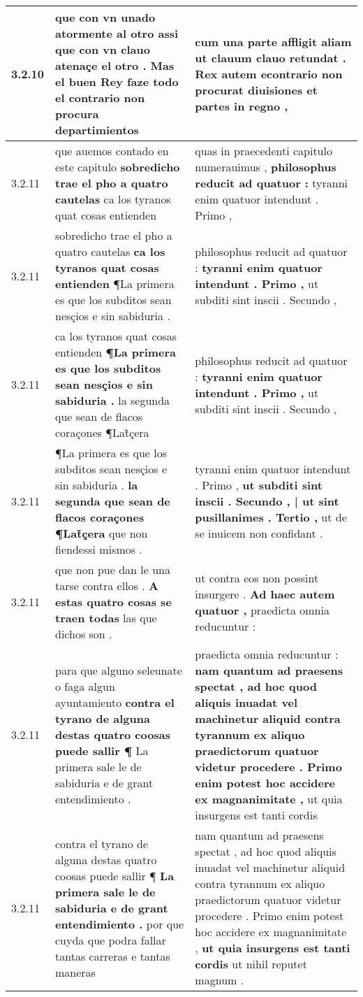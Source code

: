 \begin{tabular}{|p{1cm}|p{6.5cm}|p{6.5cm}|}
3.2.10 & que con vn unado atormente al otro assi que con vn clauo atenaçe el otro . \textbf{ Mas el buen Rey faze todo el contrario } non procura departimientos & cum una parte affligit aliam \textbf{ ut clauum clauo retundat . Rex autem econtrario non procurat diuisiones } et partes in regno , \\\hline
3.2.11 & que auemos contado en este capitulo \textbf{ sobredicho trae el pho a quatro cautelas } ca los tyranos quat cosas entienden & quas in praecedenti capitulo numerauimus , \textbf{ philosophus reducit ad quatuor : } tyranni enim quatuor intendunt . Primo , \\\hline
3.2.11 & sobredicho trae el pho a quatro cautelas \textbf{ ca los tyranos quat cosas entienden } ¶La primera es que los subditos sean nesçios e sin sabiduria . & philosophus reducit ad quatuor : \textbf{ tyranni enim quatuor intendunt . Primo , } ut subditi sint inscii . Secundo , \\\hline
3.2.11 & ca los tyranos quat cosas entienden \textbf{ ¶La primera es que los subditos sean nesçios e sin sabiduria . } la segunda que sean de flacos coraçones ¶Lat̃çera & philosophus reducit ad quatuor : \textbf{ tyranni enim quatuor intendunt . Primo , } ut subditi sint inscii . Secundo , \\\hline
3.2.11 & ¶La primera es que los subditos sean nesçios e sin sabiduria . \textbf{ la segunda que sean de flacos coraçones ¶Lat̃çera } que non fiendessi mismos . & tyranni enim quatuor intendunt . Primo , \textbf{ ut subditi sint inscii . Secundo , | ut sint pusillanimes . Tertio , } ut de se inuicem non confidant . \\\hline
3.2.11 & que non pue dan le una tarse contra ellos . \textbf{ A estas quatro cosas se traen todas } las que dichos son . & ut contra eos non possint insurgere . \textbf{ Ad haec autem quatuor , } praedicta omnia reducuntur : \\\hline
3.2.11 & para que alguno seleunate o faga algun ayuntamiento \textbf{ contra el tyrano de alguna destas quatro coosas puede sallir ¶ } La primera sale le de sabiduria e de grant entendimiento . & praedicta omnia reducuntur : \textbf{ nam quantum ad praesens spectat , ad hoc quod aliquis inuadat vel machinetur aliquid contra tyrannum ex aliquo praedictorum quatuor videtur procedere . Primo enim potest hoc accidere ex magnanimitate , } ut quia insurgens est tanti cordis \\\hline
3.2.11 & contra el tyrano de alguna destas quatro coosas puede sallir ¶ \textbf{ La primera sale le de sabiduria e de grant entendimiento . } por que cuyda que podra fallar tantas carreras e tantas maneras & nam quantum ad praesens spectat , ad hoc quod aliquis inuadat vel machinetur aliquid contra tyrannum ex aliquo praedictorum quatuor videtur procedere . Primo enim potest hoc accidere ex magnanimitate , \textbf{ ut quia insurgens est tanti cordis } ut nihil reputet magnum . \\\hline

\end{tabular}
